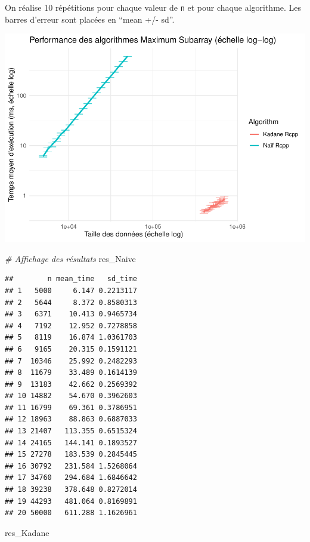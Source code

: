 \documentclass[
]{article}
\newenvironment{Shaded}{\begin{snugshade}}{\end{snugshade}}
\newcommand{\CommentTok}[1]{\textcolor[rgb]{0.56,0.35,0.01}{\textit{#1}}}
\newcommand{\NormalTok}[1]{#1}
\begin{document}
On réalise 10 répétitions pour chaque valeur de \texttt{n} et pour
chaque algorithme. Les barres d'erreur sont placées en ``mean +/- sd''.

\includegraphics{MaxSubarray1D_files/figure-latex/simu complexite-1.pdf}

\begin{Shaded}
\begin{Highlighting}[]
\CommentTok{\# Affichage des résultats}
\NormalTok{res\_Naive}
\end{Highlighting}
\end{Shaded}

\begin{verbatim}
##        n mean_time   sd_time
## 1   5000     6.147 0.2213117
## 2   5644     8.372 0.8580313
## 3   6371    10.413 0.9465734
## 4   7192    12.952 0.7278858
## 5   8119    16.874 1.0361703
## 6   9165    20.315 0.1591121
## 7  10346    25.992 0.2482293
## 8  11679    33.489 0.1614139
## 9  13183    42.662 0.2569392
## 10 14882    54.670 0.3962603
## 11 16799    69.361 0.3786951
## 12 18963    88.863 0.6887033
## 13 21407   113.355 0.6515324
## 14 24165   144.141 0.1893527
## 15 27278   183.539 0.2845445
## 16 30792   231.584 1.5268064
## 17 34760   294.684 1.6846642
## 18 39238   378.648 0.8272014
## 19 44293   481.064 0.8169891
## 20 50000   611.288 1.1626961
\end{verbatim}

\begin{Shaded}
\begin{Highlighting}[]
\NormalTok{res\_Kadane}
\end{Highlighting}
\end{Shaded}
\end{document}
